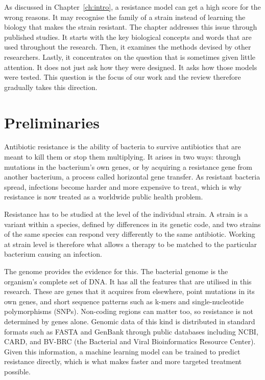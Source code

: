 \sloppy

As discussed in Chapter~\ref{ch:intro}, a resistance model can get a high score for the wrong
reasons. It may recognise the family of a strain instead of learning the biology that makes
the strain resistant. The chapter addresses this issue through published studies. It starts
with the key biological concepts and words that are used throughout the research. Then, it
examines the methods devised by other researchers. Lastly, it concentrates on the question
that is sometimes given little attention. It does not just ask how they were designed. It
asks how those models were tested. This question is the focus of our work and the review
therefore gradually takes this direction.

\section{Preliminaries}
Antibiotic resistance is the ability of bacteria to survive antibiotics that are meant to kill them or stop them multiplying. It arises in two ways: through mutations in the bacterium's own genes, or by acquiring a resistance gene from another bacterium, a process called horizontal gene transfer. As resistant bacteria spread, infections become harder and more expensive to treat, which is why resistance is now treated as a worldwide public health problem.

Resistance has to be studied at the level of the individual strain. A strain is a variant within a species, defined by differences in its genetic code, and two strains of the same species can respond very differently to the same antibiotic. Working at strain level is therefore what allows a therapy to be matched to the particular bacterium causing an infection.

The genome provides the evidence for this. The bacterial genome is the organism's complete set of DNA. It has all the features that are utilised in this research. These are genes that it acquires from elsewhere, point mutations in its own genes, and short sequence patterns such as k-mers and single-nucleotide polymorphisms (SNPs). Non-coding regions can matter too, so resistance is not determined by genes alone. Genomic data of this kind is distributed in standard formats such as FASTA and GenBank through public databases including NCBI, CARD, and BV-BRC (the Bacterial and Viral Bioinformatics Resource Center). Given this information, a machine learning model can be trained to predict resistance directly, which is what makes faster and more targeted treatment possible.

